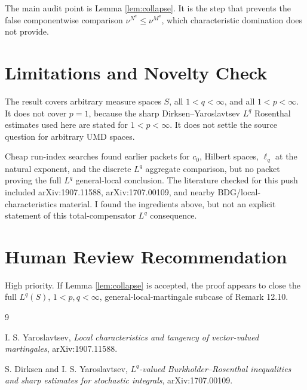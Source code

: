 \documentclass[11pt]{article}
\begin{document}
The main audit point is Lemma \ref{lem:collapse}.  It is the step that prevents
the false componentwise comparison
\(\nu^{N^a}\le\nu^{M^a}\), which characteristic domination does not provide.

\section*{Limitations and Novelty Check}

The result covers arbitrary measure spaces \(S\), all \(1<q<\infty\), and all
\(1<p<\infty\).  It does not cover \(p=1\), because the sharp
Dirksen--Yaroslavtsev \(L^q\) Rosenthal estimates used here are stated for
\(1<p<\infty\).  It does not settle the source question for arbitrary UMD
spaces.

Cheap run-index searches found earlier packets for \(c_0\), Hilbert spaces,
\(\ell_q\) at the natural exponent, and the discrete \(L^q\) aggregate
comparison, but no packet proving the full \(L^q\) general-local conclusion.
The literature checked for this push included arXiv:1907.11588,
arXiv:1707.00109, and nearby BDG/local-characteristics material.  I found the
ingredients above, but not an explicit statement of this total-compensator
\(L^q\) consequence.

\section*{Human Review Recommendation}

High priority.  If Lemma \ref{lem:collapse} is accepted, the proof appears to
close the full \(L^q(S)\), \(1<p,q<\infty\), general-local-martingale subcase
of Remark 12.10.

\begin{thebibliography}{9}

I. S. Yaroslavtsev,
\emph{Local characteristics and tangency of vector-valued martingales},
arXiv:1907.11588.

S. Dirksen and I. S. Yaroslavtsev,
\emph{\(L^q\)-valued Burkholder--Rosenthal inequalities and sharp estimates for
stochastic integrals},
arXiv:1707.00109.

\end{thebibliography}
\end{document}
